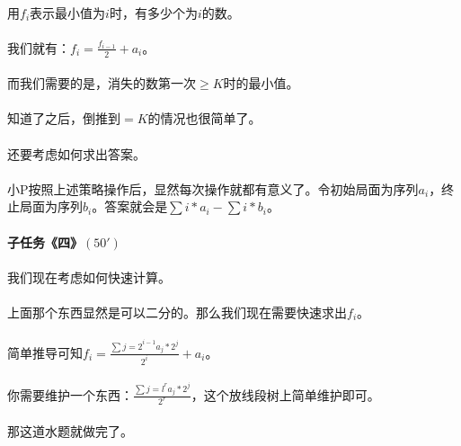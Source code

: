 \documentclass[UTF8]{ctexart}
\begin{document}
\paragraph{}用$f_i$表示最小值为$i$时，有多少个为$i$的数。
\paragraph{}我们就有：$f_i=\frac{f_{i-1}}{2}+a_i$。
\paragraph{}而我们需要的是，消失的数第一次$\geq K$时的最小值。
\paragraph{}知道了之后，倒推到$= K$的情况也很简单了。
\paragraph{}还要考虑如何求出答案。
\paragraph{}小P按照上述策略操作后，显然每次操作就都有意义了。令初始局面为序列${a_i}$，终止局面为序列${b_i}$。答案就会是$\sum i*a_i-\sum i*b_i$。
\paragraph{子任务《四》$(50')$}
\paragraph{}我们现在考虑如何快速计算。
\paragraph{}上面那个东西显然是可以二分的。那么我们现在需要快速求出${f_i}$。
\paragraph{}简单推导可知$f_i=\frac{\sum {j=2}^{i-1} a_j*2^j }{2^i} + a_i$。
\paragraph{}你需要维护一个东西：$\frac{\sum {j=l}^{r} a_j*2^j }{2^r}$，这个放线段树上简单维护即可。
\paragraph{}那这道水题就做完了。
\end{document}
